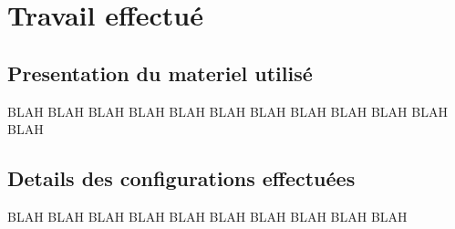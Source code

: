 \chapter{Travail effectué}

\section{Presentation du materiel utilisé}
BLAH BLAH BLAH BLAH BLAH BLAH BLAH BLAH BLAH BLAH BLAH BLAH 
\section{Details des configurations effectuées}
BLAH BLAH BLAH BLAH BLAH BLAH BLAH BLAH BLAH BLAH 

\clearpage

